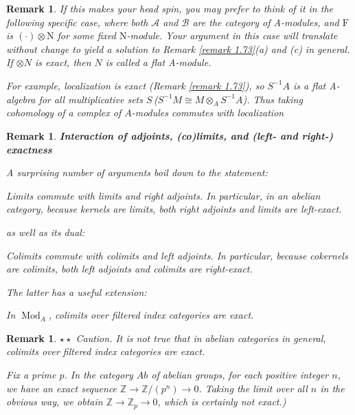 \documentclass{article}
\newtheorem{remark}[theorem]{Remark}
\begin{document}
\begin{remark}
If this makes your head spin, you may prefer to think of it in the following specific case, where both $\mathscr{A}$ and $\mathscr{B}$ are the category of A-modules, and $\mathrm{F}$ is $(\cdot) \otimes \mathrm{N}$ for some fixed $\mathrm{N}$-module. Your argument in this case will translate without change to yield a solution to Remark \ref{remark 1.73}(a) and (c) in general. If $\otimes N$ is exact, then $N$ is called a flat A-module.

For example, localization is exact (Remark \ref{remark 1.73}), so $S^{-1} A$ is a flat A-algebra for all multiplicative sets $S$\,($S^{-1}M\cong M\otimes_A S^{-1}A$). Thus taking cohomology of a complex of $A$-modules commutes with localization
\end{remark} 
\begin{remark}
\textbf{Interaction of adjoints, (co)limits, and (left- and right-) exactness}

A surprising number of arguments boil down to the statement:

Limits commute with limits and right adjoints. In particular, in an abelian category, because kernels are limits, both right adjoints and limits are left-exact.

as well as its dual:

Colimits commute with colimits and left adjoints. In particular, because cokernels are colimits, both left adjoints and colimits are right-exact.

The latter has a useful extension:

In $\operatorname{Mod}_{A}$, colimits over filtered index categories are exact.
\end{remark}
\begin{remark}
$\star \star$ Caution. It is not true that in abelian categories in general, colimits over filtered index categories are exact. %

Fix a prime $p$. In the category $A b$ of abelian groups, for each positive integer $n$, we have an exact sequence $\mathbb{Z} \rightarrow \mathbb{Z} /\left(p^{n}\right) \rightarrow 0$. Taking the limit over all $n$ in the obvious way, we obtain $\mathbb{Z} \rightarrow \mathbb{Z}_{p} \rightarrow 0$, which is certainly not exact.)

\end{remark}
\end{document}
